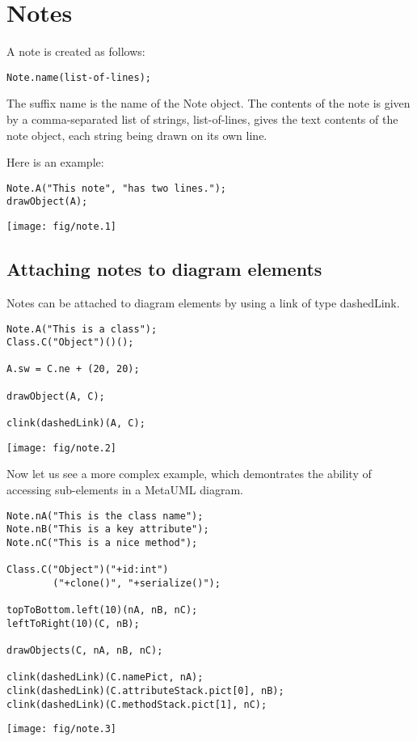 \documentclass{article}
\newcommand{\code}{\ttfamily}
\begin{document}
\section{Notes}

A note is created as follows:

\begin{verbatim}
Note.name(list-of-lines);
\end{verbatim}

The suffix {\code name} is the name of the {\code Note} object. The contents of the note is given by a comma-separated
list of strings, {\code list-of-lines}, gives the text contents of the note object, each string being drawn on its own
line.

Here is an example:

\begin{multicols}{2}
\begin{verbatim}
Note.A("This note", "has two lines.");
drawObject(A);
\end{verbatim}
\columnbreak
\hspace{3cm}\texttt{[image: fig/note.1]}
\end{multicols}

\subsection{Attaching notes to diagram elements}

Notes can be attached to diagram elements by using a link of type {\code dashedLink}.

\begin{multicols}{2}
\begin{verbatim}
Note.A("This is a class");
Class.C("Object")()();

A.sw = C.ne + (20, 20);

drawObject(A, C);

clink(dashedLink)(A, C);
\end{verbatim}
\columnbreak
\hspace{1cm}\texttt{[image: fig/note.2]}
\end{multicols}

Now let us see a more complex example, which demontrates the ability of accessing sub-elements in a MetaUML diagram.
\pagebreak

\begin{multicols}{2}
\begin{verbatim}
Note.nA("This is the class name");
Note.nB("This is a key attribute");
Note.nC("This is a nice method");

Class.C("Object")("+id:int")
        ("+clone()", "+serialize()");

topToBottom.left(10)(nA, nB, nC);
leftToRight(10)(C, nB);

drawObjects(C, nA, nB, nC);

clink(dashedLink)(C.namePict, nA); 
clink(dashedLink)(C.attributeStack.pict[0], nB); 
clink(dashedLink)(C.methodStack.pict[1], nC);
\end{verbatim}
\columnbreak
\hspace{1cm}\texttt{[image: fig/note.3]}
\end{multicols}
\end{document}
